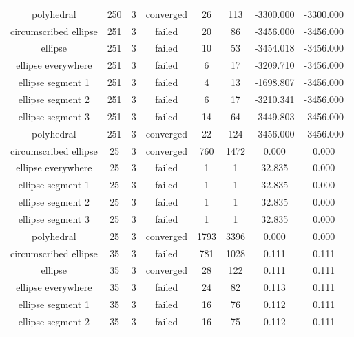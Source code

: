 \begin{scriptsize}
\begin{center}
\begin{longtable}{ c c c c c c c c }
        polyhedral        &  250  &  3  & converged  &   26  &  113  & -3300.000  & -3300.000  \\
  circumscribed ellipse   &  251  &  3  &   failed   &   20  &   86  & -3456.000  & -3456.000  \\
         ellipse          &  251  &  3  &   failed   &   10  &   53  & -3454.018  & -3456.000  \\
    ellipse everywhere    &  251  &  3  &   failed   &   6   &   17  & -3209.710  & -3456.000  \\
    ellipse segment 1     &  251  &  3  &   failed   &   4   &   13  & -1698.807  & -3456.000  \\
    ellipse segment 2     &  251  &  3  &   failed   &   6   &   17  & -3210.341  & -3456.000  \\
    ellipse segment 3     &  251  &  3  &   failed   &   14  &   64  & -3449.803  & -3456.000  \\
        polyhedral        &  251  &  3  & converged  &   22  &  124  & -3456.000  & -3456.000  \\
  circumscribed ellipse   &   25  &  3  & converged  &  760  &  1472 &   0.000    &   0.000    \\
    ellipse everywhere    &   25  &  3  &   failed   &   1   &   1   &   32.835   &   0.000    \\
    ellipse segment 1     &   25  &  3  &   failed   &   1   &   1   &   32.835   &   0.000    \\
    ellipse segment 2     &   25  &  3  &   failed   &   1   &   1   &   32.835   &   0.000    \\
    ellipse segment 3     &   25  &  3  &   failed   &   1   &   1   &   32.835   &   0.000    \\
        polyhedral        &   25  &  3  & converged  &  1793 &  3396 &   0.000    &   0.000    \\
  circumscribed ellipse   &   35  &  3  &   failed   &  781  &  1028 &   0.111    &   0.111    \\
         ellipse          &   35  &  3  & converged  &   28  &  122  &   0.111    &   0.111    \\
    ellipse everywhere    &   35  &  3  &   failed   &   24  &   82  &   0.113    &   0.111    \\
    ellipse segment 1     &   35  &  3  &   failed   &   16  &   76  &   0.112    &   0.111    \\
    ellipse segment 2     &   35  &  3  &   failed   &   16  &   75  &   0.112    &   0.111    \\

\end{longtable}
\end{center}
\end{scriptsize}
